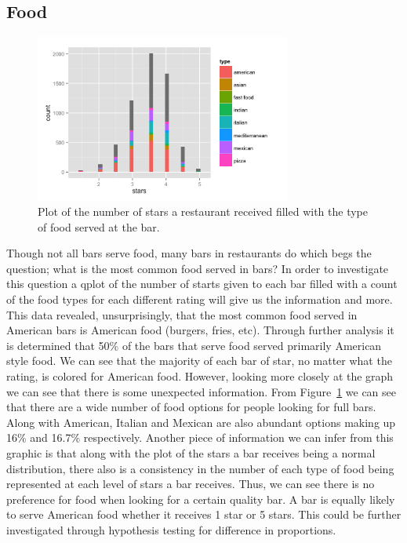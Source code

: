 \documentclass[11pt]{article}
\begin{document}
\subsection{Food}

\begin{figure}[h!]
  \caption{Plot of the number of stars a restaurant received filled with the type of food served at the bar.}
  \centering
  \label{food}
    \includegraphics[width=0.75\textwidth]{Figures/Food_bars.png}
\end{figure}

Though not all bars serve food, many bars in restaurants do which begs the question; what is the most common food served in bars?  In order to investigate this question a qplot of the number of starts given to each bar filled with a count of the food types for each different rating will give us the information and more.  This data revealed, unsurprisingly, that the most common food served in American bars is American food (burgers, fries, etc). Through further analysis it is determined that 50$\%$ of the bars that serve food served primarily American style food.  We can see that the majority of each bar of star, no matter what the rating, is colored for American food.  However, looking more closely at the graph we can see that there is some unexpected information.  From Figure~\ref{food} we can see that there are a wide number of food options for people looking for full bars.  Along with American, Italian and Mexican are also abundant options making up 16$\%$ and 16.7$\%$ respectively.  Another piece of information we can infer from this graphic is that along with the plot of the stars a bar receives being a normal distribution, there also is a consistency in the number of each type of food being represented at each level of stars a bar receives.  Thus, we can see there is no preference for food when looking for a certain quality bar. A bar is equally likely to serve American food whether it receives 1 star or 5 stars.  This could be further investigated through hypothesis testing for difference in proportions.
\end{document}
